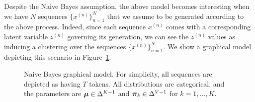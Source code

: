 \documentclass{article}
\begin{document}
Despite the Naive Bayes assumption, the above model becomes interesting when we have $N$ sequences $\{x^{(n)}\}_{n=1}^N$ that we assume to be generated according to the above process. Indeed, since each sequence $x^{(n)}$ comes with a corresponding latent variable $z^{(n)}$ governing its generation, we can see the $z^{(n)}$ values as inducing a clustering over the sequences $\{x^{(n)}\}_{n=1}^N$. We show a graphical model depicting this scenario in Figure~\ref{fig:nbgm}.


\begin{figure}
\centering
{}
 \caption{Naive Bayes graphical model. For simplicity, all sequences are depicted as having $T$ tokens. All distributions are categorical, and the parameters are $\boldsymbol{\mu} \in \Delta^{K-1}$ and $\boldsymbol{\pi}_k \in \Delta^{V-1}$ for $k = 1, \dots, K$.}
 \label{fig:nbgm}
\end{figure}
\end{document}
